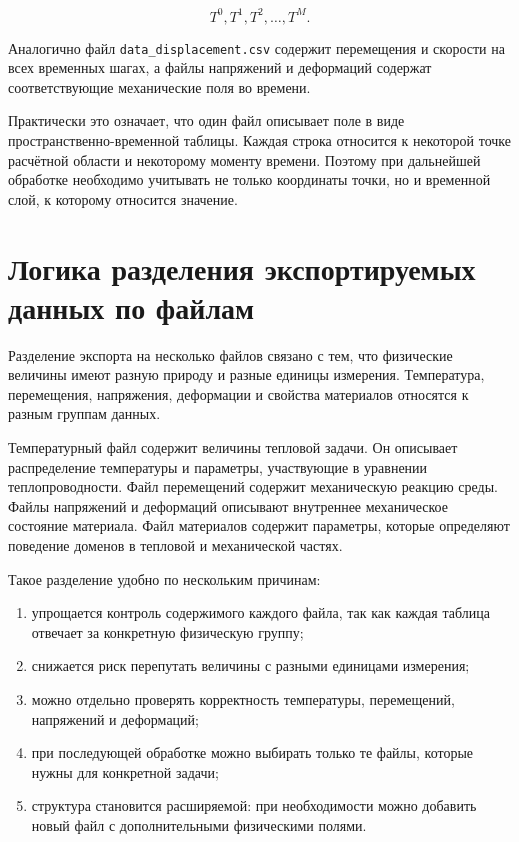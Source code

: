 \begin{equation}
T^0,T^1,T^2,\ldots,T^M.
\end{equation}

Аналогично файл \texttt{data\_displacement.csv} содержит перемещения и скорости на всех временных шагах, а файлы напряжений и деформаций содержат соответствующие механические поля во времени.

Практически это означает, что один файл описывает поле в виде пространственно-временной таблицы. Каждая строка относится к некоторой точке расчётной области и некоторому моменту времени. Поэтому при дальнейшей обработке необходимо учитывать не только координаты точки, но и временной слой, к которому относится значение.

\section{Логика разделения экспортируемых данных по файлам}

Разделение экспорта на несколько файлов связано с тем, что физические величины имеют разную природу и разные единицы измерения. Температура, перемещения, напряжения, деформации и свойства материалов относятся к разным группам данных.

Температурный файл содержит величины тепловой задачи. Он описывает распределение температуры и параметры, участвующие в уравнении теплопроводности. Файл перемещений содержит механическую реакцию среды. Файлы напряжений и деформаций описывают внутреннее механическое состояние материала. Файл материалов содержит параметры, которые определяют поведение доменов в тепловой и механической частях.

Такое разделение удобно по нескольким причинам:

\begin{enumerate}
    \item упрощается контроль содержимого каждого файла, так как каждая таблица отвечает за конкретную физическую группу;
    \item снижается риск перепутать величины с разными единицами измерения;
    \item можно отдельно проверять корректность температуры, перемещений, напряжений и деформаций;
    \item при последующей обработке можно выбирать только те файлы, которые нужны для конкретной задачи;
    \item структура становится расширяемой: при необходимости можно добавить новый файл с дополнительными физическими полями.
\end{enumerate}

